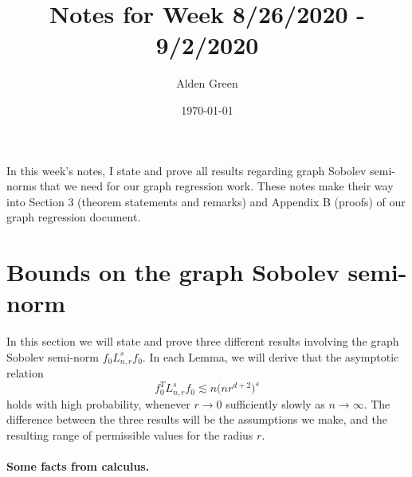 \documentclass{article}
\newcommand{\1}{\mathbf{1}}
\newcommand{\Lap}{L}
\theoremstyle{alden}
\theoremstyle{aldenthm}
\theoremstyle{definition}
\theoremstyle{remark}
\begin{document}
\title{Notes for Week 8/26/2020 - 9/2/2020}
\author{Alden Green}
\date{\today}
\maketitle

In this week's notes, I state and prove all results regarding graph Sobolev semi-norms that we need for our graph regression work. These notes make their way into Section 3 (theorem statements and remarks) and Appendix B (proofs) of our graph regression document.

\section{Bounds on the graph Sobolev semi-norm}
In this section we will state and prove three different results involving the graph Sobolev semi-norm $f_0 \Lap_{n,r}^s f_0$. In each Lemma, we will derive that the asymptotic relation
\begin{equation*}
f_0^T \Lap_{n,r}^s f_0 \lesssim n \bigl(nr^{d + 2}\bigr)^s
\end{equation*}
holds with high probability, whenever $r \to 0$ sufficiently slowly as $n \to \infty$. The difference between the three results will be the assumptions we make, and the resulting range of permissible values for the radius $r$. 

\paragraph{Some facts from calculus.}
\end{document}
